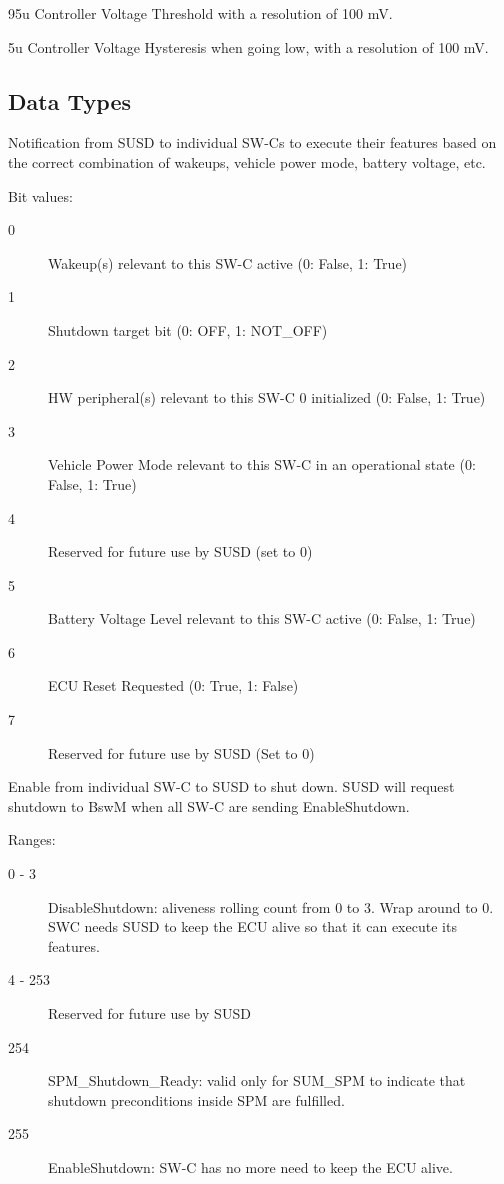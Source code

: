 {
{95u}
{Controller Voltage Threshold with a resolution of 100 mV.}}
{}

{
{5u}
{Controller Voltage Hysteresis when going low, with a resolution of 100 mV.}}
{ }

\subsection{Data Types}


{
{}
{Notification from SUSD to individual SW-Cs to execute their features based on the correct combination of wakeups, vehicle power mode, battery voltage, etc.

Bit values: 
\begin{description}
\item[0] Wakeup(s) relevant to this SW-C active (0: False, 1: True)
\item[1] Shutdown target bit (0: OFF, 1: NOT\_OFF)
\item[2] HW peripheral(s) relevant to this SW-C	0 initialized (0: False, 1: True)
\item[3] Vehicle Power Mode relevant to this SW-C in an operational state (0: False, 1: True)
\item[4] Reserved for future use by SUSD (set to 0)
\item[5] Battery Voltage Level relevant to this SW-C active (0: False, 1: True)
\item[6] ECU Reset Requested (0: True, 1: False)
\item[7] Reserved for future use by SUSD (Set to 0)
\end{description}
}
}
{   }

{
{}
{Enable from individual SW-C to SUSD to shut down. SUSD will request shutdown to BswM when all SW-C are sending EnableShutdown.

Ranges: 
\begin{description}
\item[0 - 3] DisableShutdown: aliveness rolling count from 0 to 3. Wrap around to 0. SWC needs SUSD to keep the ECU alive so that it can execute its features.
\item[4 - 253] Reserved for future use by SUSD
\item[254] SPM\_Shutdown\_Ready: valid only for SUM\_SPM to indicate that shutdown preconditions inside SPM are fulfilled.
\item[255] EnableShutdown: SW-C has no more need to keep the ECU alive.
\end{description}
}
}
{ }

